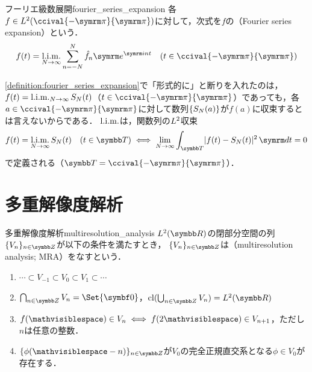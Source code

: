 \documentclass[../../main]{subfiles}
\begin{document}
\begin{definition}{フーリエ級数展開}{fourier_series_expansion}
  各\(f\in\Lebesgue{2}(\ccival{-\krez}{\krez})\)に対して，次式を\(f\)の（Fourier series expansion）という．
  \[
    f(t) = \sqlim_{N\to\infty}\sum_{n=-N}^N\hat{f}_n\napr^{\iuni nt}\quad(t\in\ccival{-\krez}{\krez})
  \]
\end{definition}

\begin{note}
  \cref{definition:fourier_series_expansion}で「形式的に」と断りを入れたのは，\(f(t)=\operatorname*{l{.}i{.}m{.}}_{N\to\infty}S_N(t)\)（\(t\in\ccival{-\krez}{\krez}\)）であっても，各\(a\in\ccival{-\krez}{\krez}\)に対して数列\(\lbrace S_N(a)\rbrace\)が\(f(a)\)に収束するとは言えないからである．
  \(\operatorname*{l{.}i{.}m{.}}\)は，関数列の\(\Lebesgue{2}\)収束
  \[
    f(t)=\sqlim_{N\to\infty}S_N(t)\quad(t\in\torus)
    \iff\lim_{N\to\infty}\int_{\torus}\abs{f(t)-S_N(t)}^2\intd{t} = 0
  \]
  で定義される（\(\torus=\ccival{-\krez}{\krez}\)）．
\end{note}

\section{多重解像度解析}

\begin{definition}{多重解像度解析}{multiresolution_analysis}
  \(\Lebesgue{2}(\numset{R})\)の閉部分空間の列\(\seq{V_n}_{n\in\numset{Z}}\)が以下の条件を満たすとき，
  \(\seq{V_n}_{n\in\numset{Z}}\)は（multiresolution analysis; MRA）をなすという．
  \begin{enumerate}
    \item \(\dotsb\subset V_{-1}\subset V_0\subset V_1\subset\dotsb\)
    \item \(\bigcap_{n\in\numset{Z}}V_n=\Set{\vect{0}}\)，\(\clsr(\bigcup_{n\in\numset{Z}}V_n)=\Lebesgue{2}(\numset{R})\)
    \item \(f(\holder)\in V_n\iff f(2\holder)\in V_{n+1}\)，ただし\(n\)は任意の整数．
    \item \(\seq{\phi(\holder-n)}_{n\in\numset{Z}}\)が\(V_0\)の完全正規直交系となる\(\phi\in V_0\)が存在する．
  \end{enumerate}
\end{definition}
\end{document}
